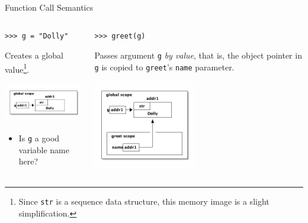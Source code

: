 \documentclass[smaller, aspectratio=1610]{beamer}
\begin{document}
\begin{frame}[label={sec:org0bf1cf7},fragile]{Function Call Semantics}
 \begin{columns}
\begin{column}{0.3\columnwidth}
\begin{block}{}
\lstset{language=Python,label= ,caption= ,captionpos=b,numbers=none}
\begin{lstlisting}
>>> g = "Dolly"
\end{lstlisting}

Creates a global value\footnote{Since \texttt{str} is a sequence data structure, this memory image is a slight simplification.}.

\begin{center}
\includegraphics[width=1.75in]{diagrams/dolly.png}
\end{center}

\begin{itemize}
\item Is \texttt{g} a good variable name here?
\end{itemize}
\end{block}
\end{column}

\begin{column}{0.3\columnwidth}
\begin{block}{}
\lstset{language=Python,label= ,caption= ,captionpos=b,numbers=none}
\begin{lstlisting}
>>> greet(g)
\end{lstlisting}

Passes argument \texttt{g} \emph{by value}, that is, the object pointer in \texttt{g} is copied to \texttt{greet}'s \texttt{name} parameter.

\begin{center}
\includegraphics[width=1.75in]{diagrams/greet-dolly.png}
\end{center}
\end{block}
\end{column}



\end{columns}
\end{frame}
\end{document}
